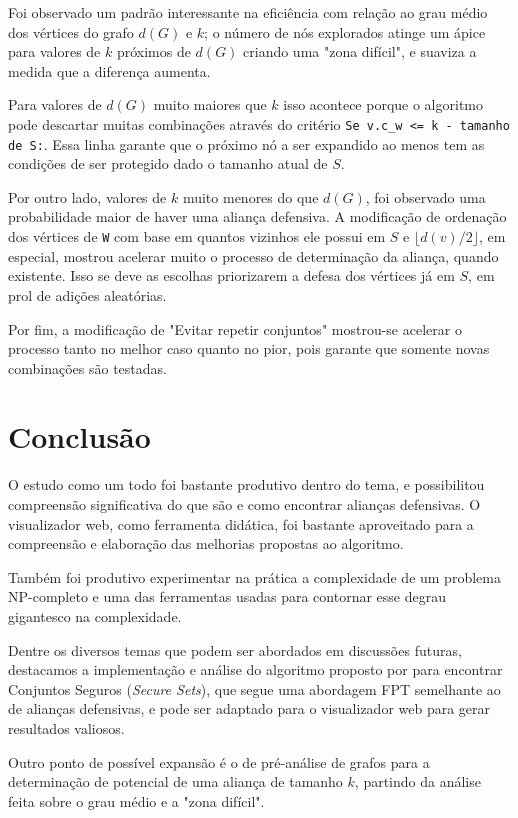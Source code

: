 Foi observado um padrão interessante na eficiência com relação ao grau médio dos vértices do grafo $d(G)$ e $k$; o número de nós explorados atinge um ápice para valores de $k$ próximos de $d(G)$ criando uma "zona difícil", e suaviza a medida que a diferença aumenta.

Para valores de $d(G)$ muito maiores que $k$ isso acontece porque o algoritmo pode descartar muitas combinações através do critério \texttt{Se v.c\_w <= k - tamanho de S:}. Essa linha garante que o próximo nó a ser expandido ao menos tem as condições de ser protegido dado o tamanho atual de $S$.

Por outro lado, valores de $k$ muito menores do que $d(G)$, foi observado uma probabilidade maior de haver uma aliança defensiva. A modificação de ordenação dos vértices de \texttt{W} com base em quantos vizinhos ele possui em $S$ e $\lfloor d(v)/2 \rfloor$, em especial, mostrou acelerar muito o processo de determinação da aliança, quando existente. Isso se deve as escolhas priorizarem a defesa dos vértices já em $S$, em prol de adições aleatórias.

Por fim, a modificação de "Evitar repetir conjuntos" mostrou-se acelerar o processo tanto no melhor caso quanto no pior, pois garante que somente novas combinações são testadas.

\chapter{Conclusão}
O estudo como um todo foi bastante produtivo dentro do tema, e possibilitou compreensão significativa do que são e como encontrar alianças defensivas. O visualizador web, como ferramenta didática, foi bastante aproveitado para a compreensão e elaboração das melhorias propostas ao algoritmo.

Também foi produtivo experimentar na prática a complexidade de um problema NP-completo e uma das ferramentas usadas para contornar esse degrau gigantesco na complexidade.

Dentre os diversos temas que podem ser abordados em discussões futuras, destacamos a implementação e análise do algoritmo proposto por \cite{Enciso2009} para encontrar Conjuntos Seguros (\textit{Secure Sets}), que segue uma abordagem FPT semelhante ao de alianças defensivas, e pode ser adaptado para o visualizador web para gerar resultados valiosos.

Outro ponto de possível expansão é o de pré-análise de grafos para a determinação de potencial de uma aliança de tamanho $k$, partindo da análise feita sobre o grau médio e a "zona difícil".
